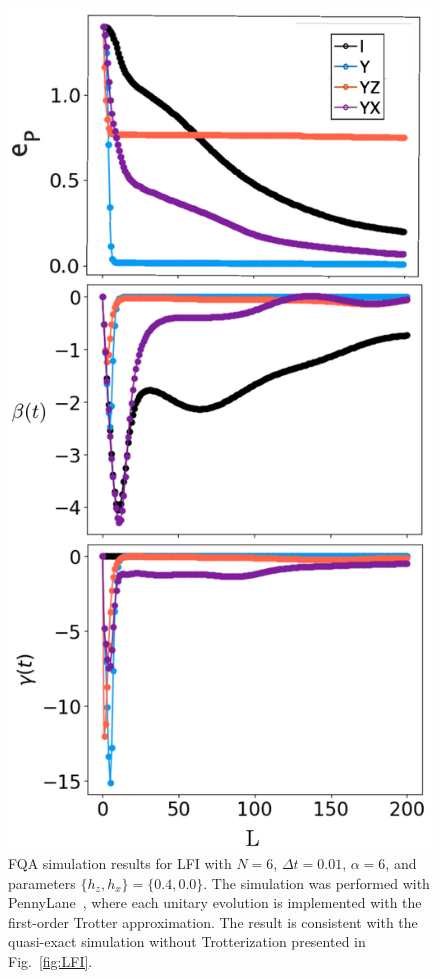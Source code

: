 \documentclass[twocolumn,aps,superscriptaddress,floatfix,longbibliography]{revtex4-2}
\begin{document}
\begin{figure}[h!]
    \centering
    \includegraphics[scale=0.5]{pennylane_vf.pdf}
    \caption{FQA simulation results for LFI with $N=6$, $\Delta t = 0.01$, $\alpha=6$, and parameters $\{h_z,h_x\} = \{0.4,0.0\}$. The simulation was performed with PennyLane~\cite{bergholm2018pennylane}, where each unitary evolution is implemented with the first-order Trotter approximation. The result is consistent with the quasi-exact simulation without Trotterization presented in Fig.~\ref{fig:LFI}.}
    \label{fig:PLLFI}
\end{figure}
\end{document}
